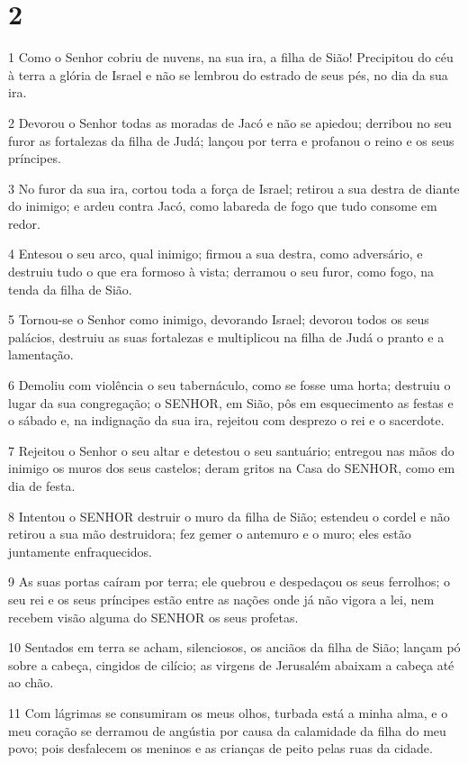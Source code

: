 \chapter{2}

\par 1 Como o Senhor cobriu de nuvens, na sua ira, a filha de Sião! Precipitou do céu à terra a glória de Israel e não se lembrou do estrado de seus pés, no dia da sua ira.
\par 2 Devorou o Senhor todas as moradas de Jacó e não se apiedou; derribou no seu furor as fortalezas da filha de Judá; lançou por terra e profanou o reino e os seus príncipes.
\par 3 No furor da sua ira, cortou toda a força de Israel; retirou a sua destra de diante do inimigo; e ardeu contra Jacó, como labareda de fogo que tudo consome em redor.
\par 4 Entesou o seu arco, qual inimigo; firmou a sua destra, como adversário, e destruiu tudo o que era formoso à vista; derramou o seu furor, como fogo, na tenda da filha de Sião.
\par 5 Tornou-se o Senhor como inimigo, devorando Israel; devorou todos os seus palácios, destruiu as suas fortalezas e multiplicou na filha de Judá o pranto e a lamentação.
\par 6 Demoliu com violência o seu tabernáculo, como se fosse uma horta; destruiu o lugar da sua congregação; o SENHOR, em Sião, pôs em esquecimento as festas e o sábado e, na indignação da sua ira, rejeitou com desprezo o rei e o sacerdote.
\par 7 Rejeitou o Senhor o seu altar e detestou o seu santuário; entregou nas mãos do inimigo os muros dos seus castelos; deram gritos na Casa do SENHOR, como em dia de festa.
\par 8 Intentou o SENHOR destruir o muro da filha de Sião; estendeu o cordel e não retirou a sua mão destruidora; fez gemer o antemuro e o muro; eles estão juntamente enfraquecidos.
\par 9 As suas portas caíram por terra; ele quebrou e despedaçou os seus ferrolhos; o seu rei e os seus príncipes estão entre as nações onde já não vigora a lei, nem recebem visão alguma do SENHOR os seus profetas.
\par 10 Sentados em terra se acham, silenciosos, os anciãos da filha de Sião; lançam pó sobre a cabeça, cingidos de cilício; as virgens de Jerusalém abaixam a cabeça até ao chão.
\par 11 Com lágrimas se consumiram os meus olhos, turbada está a minha alma, e o meu coração se derramou de angústia por causa da calamidade da filha do meu povo; pois desfalecem os meninos e as crianças de peito pelas ruas da cidade.
